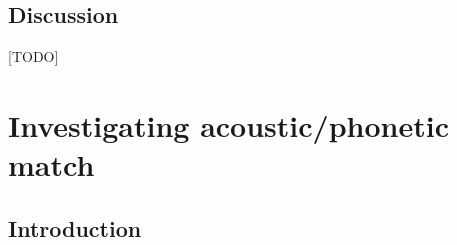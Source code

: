 {\subsection{Discussion}
{\color{red}[TODO]}










\newpage
\section{{\color{red}Investigating acoustic/phonetic match}} \label{3-acmatch}
\subsection{Introduction}
}
